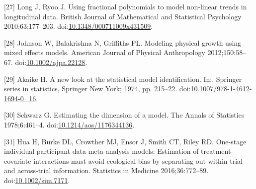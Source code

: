 \documentclass[14pt,]{article}
\begin{document}
\leavevmode\hypertarget{ref-Long_2010}{}%
{[}27{]} Long J, Ryoo J. Using fractional polynomials to model
non-linear trends in longitudinal data. British Journal of Mathematical
and Statistical Psychology 2010;63:177--203.
doi:\href{https://doi.org/10.1348/000711009x431509}{10.1348/000711009x431509}.

\leavevmode\hypertarget{ref-Johnson_2012}{}%
{[}28{]} Johnson W, Balakrishna N, Griffiths PL. Modeling physical
growth using mixed effects models. American Journal of Physical
Anthropology 2012;150:58--67.
doi:\href{https://doi.org/10.1002/ajpa.22128}{10.1002/ajpa.22128}.

\leavevmode\hypertarget{ref-Akaike_1974}{}%
{[}29{]} Akaike H. A new look at the statistical model identification.
In:. Springer series in statistics, Springer New York; 1974, pp.
215--22.
doi:\href{https://doi.org/10.1007/978-1-4612-1694-0_16}{10.1007/978-1-4612-1694-0\_16}.

\leavevmode\hypertarget{ref-Schwarz_1978}{}%
{[}30{]} Schwarz G. Estimating the dimension of a model. The Annals of
Statistics 1978;6:461--4.
doi:\href{https://doi.org/10.1214/aos/1176344136}{10.1214/aos/1176344136}.

\leavevmode\hypertarget{ref-Hua_2016}{}%
{[}31{]} Hua H, Burke DL, Crowther MJ, Ensor J, Smith CT, Riley RD.
One-stage individual participant data meta-analysis models: Estimation
of treatment-covariate interactions must avoid ecological bias by
separating out within-trial and across-trial information. Statistics in
Medicine 2016;36:772--89.
doi:\href{https://doi.org/10.1002/sim.7171}{10.1002/sim.7171}.
\end{document}
